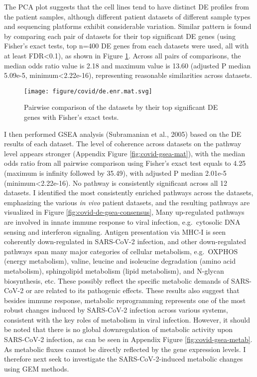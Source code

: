 \documentclass[12pt,twoside,openany,\mydriver]{thesis}  %
\begin{document}
The PCA plot suggests that the cell lines tend to have distinct DE profiles from the patient samples, although different patient datasets of different sample types and sequencing platforms exhibit considerable variation. Similar pattern is found by comparing each pair of datasets for their top significant DE genes (using Fisher's exact tests, top n=400 DE genes from each datasets were used, all with at least FDR\textless{}0.1), as shown in Figure \ref{fig:covid-de-mat}. Across all pairs of comparisons, the median odds ratio value is 2.18 and maximum value is 13.60 (adjusted P median 5.09e-5, minimum\textless{}2.22e-16), representing reasonable similarities across datasets.
\begin{figure}
\texttt{[image: figure/covid/de.enr.mat.svg]} \caption{Pairwise comparison of the datasets by their top significant DE genes with Fisher's exact tests.}\label{fig:covid-de-mat}
\end{figure}
I then performed GSEA analysis (Subramanian et al., 2005) based on the DE results of each dataset. The level of coherence across datasets on the pathway level appears stronger (Appendix Figure \ref{fig:covid-gsea-mat}), with the median odds ratio from all pairwise comparison using Fisher's exact test equals to 4.25 (maximum is infinity followed by 35.49), with adjusted P median 2.01e-5 (minimum\textless{}2.22e-16). No pathway is consistently significant across all 12 datasets. I identified the most consistently enriched pathways across the datasets, emphasizing the various \emph{in vivo} patient datasets, and the resulting pathways are visualized in Figure \ref{fig:covid-de-gsea-consensus}, Many up-regulated pathways are involved in innate immune response to viral infection, e.g.~cytosolic DNA sensing and interferon signaling. Antigen presentation via MHC-I is seen coherently down-regulated in SARS-CoV-2 infection, and other down-regulated pathways span many major categories of cellular metabolism, e.g.~OXPHOS (energy metabolism), valine, leucine and isoleucine degradation (amino acid metabolism), sphingolipid metabolism (lipid metabolism), and N-glycan biosynthesis, etc. These possibly reflect the specific metabolic demands of SARS-CoV-2 or are related to its pathogenic effects. These results also suggest that besides immune response, metabolic reprogramming represents one of the most robust changes induced by SARS-CoV-2 infection across various systems, consistent with the key roles of metabolism in viral infection. However, it should be noted that there is no global downregulation of metabolic activity upon SARS-CoV-2 infection, as can be seen in Appendix Figure \ref{fig:covid-gsea-metab}. As metabolic fluxes cannot be directly reflected by the gene expression levels. I therefore next seek to investigate the SARS-CoV-2-induced metabolic changes using GEM methods.
\end{document}
